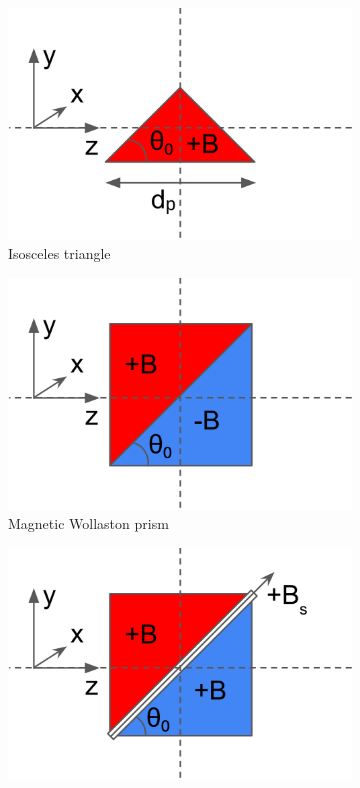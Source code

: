 \begin{figure}[htbp]
	\centering
	\begin{subfigure}[b]{0.3\textwidth}
		\centering
		\includegraphics[width=\textwidth]{iso-schematic}
		\caption{Isosceles triangle}
		\label{fig:precession-devices:iso}
	\end{subfigure}
	\hfill
	\begin{subfigure}[b]{0.3\textwidth}
		\centering
		\includegraphics[width=\textwidth]{wp-schematic}
		\caption{Magnetic Wollaston prism}
		\label{fig:precession-devices:wsp}
	\end{subfigure}
	\hfill
	\begin{subfigure}[b]{0.3\textwidth}
		\centering
		\includegraphics[width=\textwidth]{foil-schematic}

\end{subfigure}
\end{figure}
